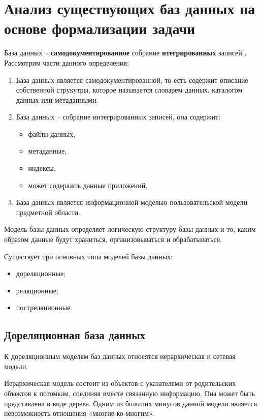 \section{Анализ существующих баз данных на основе формализации задачи}
База данных -- \textbf{самодокументированное} собрание \textbf{нтегрированных} записей \cite{kranke}. Рассмотрим части данного определения:
\begin{enumerate}
    \item База данных является самодокументированной, то есть содержит описание собственной струкутры, которое называется 
    словарем данных, каталогом данных или метаданными.
    \item База данных -- собрание интегрированных записей, она содержит:
    \begin{itemize}
        \item файлы данных,
        \item метаданные,
        \item индексы,
        \item может содеражть данные приложений.
    \end{itemize}
    \item База данных является информационной моделью пользовательской модели предметной области.
\end{enumerate}

Модель базы данных определяет логическую структуру базы данных и то, каким образом данные будут храниться, организовываться
и обрабатываться.

Существует три основных типа моделей базы данных:
\begin{itemize}
    \item дореляционные;
    \item реляционные;
    \item постреляционные.
\end{itemize}

\subsection{Дореляционная база данных}

К дореляционным моделям баз данных относятся иерархическая и сетевая модели.

Иерархическая модель состоит из объектов с указателями от родительских объектов к потомкам, 
соединяя вместе связанную информацию. Она может быть представлена в виде дерева. Одним из больших минусов данной
модели является невозможность отношения «многие-ко-многим».

